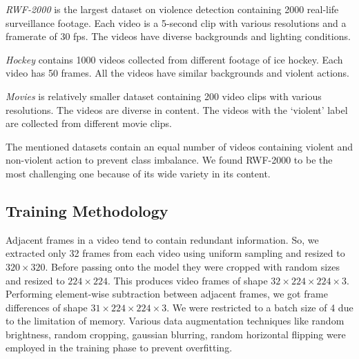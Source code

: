 \documentclass[conference]{IEEEtran}
\begin{document}
\emph{RWF-2000} \cite{cheng2019rwf} is the largest dataset on violence detection containing 2000 real-life surveillance footage. Each video is a 5-second clip with various resolutions and a framerate of 30 fps. The videos have diverse backgrounds and lighting conditions.

\emph{Hockey} \cite{nievas2011violence} contains 1000 videos collected from different footage of ice hockey. Each video has 50 frames. All the videos have similar backgrounds and violent actions.

\emph{Movies} \cite{nievas2011violence} is relatively smaller dataset containing 200 video clips with various resolutions. The videos are diverse in content. The videos with the `violent' label are collected from different movie clips.

The mentioned datasets contain an equal number of videos containing violent and non-violent action to prevent class imbalance. We found RWF-2000 to be the most challenging one because of its wide variety in its content.






\subsection{Training Methodology}
Adjacent frames in a video tend to contain redundant information. So, we extracted only 32 frames from each video using uniform sampling and resized to \(320 \times 320\). Before passing onto the model they were cropped with random sizes and resized to \(224\times224\). This produces video frames of shape \(32\times224\times224\times3\). Performing element-wise subtraction between adjacent frames, we got frame differences of shape \(31 \times 224 \times 224 \times 3 \). We were restricted to a batch size of 4 due to the limitation of memory. Various data augmentation techniques like random brightness, random cropping, gaussian blurring, random horizontal flipping were employed in the training phase to prevent overfitting.
\end{document}
